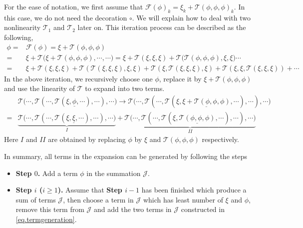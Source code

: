 For the ease of notation, we first assume that $\mathcal{F}(\phi)_k=\xi_k+\mathcal{T}(\phi,\phi,\phi)_k$.
In this case, we do not need the decoration $\circ$. We will explain how to deal with two nonlinearity $\mathcal{T}_1$ and $\mathcal{T}_2$ later on. This iteration process can be described as the following, 
\begin{equation*}
\begin{split}
 \phi=&\mathcal{F}(\phi)=\xi+\mathcal{T}(\phi,\phi,\phi)
 \\
 =&\xi+\mathcal{T}\Big(\xi+\mathcal{T}(\phi,\phi,\phi),
 \cdots,
 \cdots\Big)=\xi+\mathcal{T}(\xi,\xi,\xi)+\mathcal{T}\Big(\mathcal{T}(\phi,\phi,\phi),
 \xi,
 \xi\Big)\cdots
 \\
 =&\xi+\mathcal{T}(\xi,\xi,\xi)+\mathcal{T}(\mathcal{T}(\xi,\xi,\xi),\xi,\xi)
 +\mathcal{T}(\xi,\mathcal{T}(\xi,\xi,\xi),\xi)
 +\mathcal{T}(\xi,\xi,\mathcal{T}(\xi,\xi,\xi))+\cdots
\end{split} 
\end{equation*}
In the above iteration, we recursively choose one $\phi$, replace it by $\xi+\mathcal{T}(\phi,\phi,\phi)$ and use the linearity of $\mathcal{T}$ to expand into two terms.
\begin{equation}\label{eq.termgeneration}
\begin{split}
 &\mathcal{T}\Big(\cdots,\mathcal{T}(\cdots,\mathcal{T}(\xi,\underline{\phi},\cdots),\cdots),\cdots\Big)\rightarrow \mathcal{T}\Big(\cdots,\mathcal{T}(\cdots,\mathcal{T}(\xi,\underline{\xi+\mathcal{T}(\phi,\phi,\phi)},\cdots),\cdots),\cdots\Big)
 \\
 =& \underbrace{\mathcal{T}\Big(\cdots,\mathcal{T}(\cdots,\mathcal{T}(\xi,\underline{\xi},\cdots),\cdots),\cdots\Big)}_{I}
 +\underbrace{\mathcal{T}\Big(\cdots,\mathcal{T}(\cdots,\mathcal{T}(\xi,\underline{\mathcal{T}(\phi,\phi,\phi)},\cdots),\cdots),\cdots\Big)}_{II}
\end{split} 
\end{equation}
Here $I$ and $II$ are obtained by replacing $\phi$ by $\xi$ and $\mathcal{T}(\phi,\phi,\phi)$ respectively.

In summary, all terms in the expansion can be generated by following the steps

\begin{itemize}
 \item \textbf{Step $0$.} Add a term $\phi$ in the summation $\mathcal{J}$.
 \item \textbf{Step $i$ ($i\ge 1$).} Assume that \textbf{Step $i-1$} has been finished which produce a sum of terms $\mathcal{J}$, then choose a term in $\mathcal{J}$ which has least number of $\xi$ and $\phi$, remove this term from $\mathcal{J}$ and add the two terms in $\mathcal{J}$ constructed in \eqref{eq.termgeneration}.
\end{itemize}

